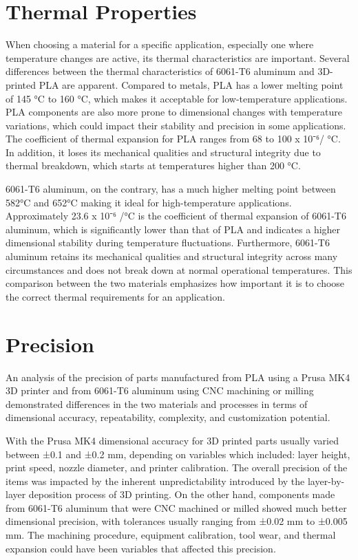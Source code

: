 \section{Thermal Properties}

    When choosing a material for a specific application, especially one where temperature changes are
    active, its thermal characteristics are important. Several differences between the thermal
    characteristics of 6061-T6 aluminum and 3D-printed PLA are apparent. Compared to metals, PLA has a
    lower melting point of 145 °C to 160 °C, which makes it acceptable for low-temperature applications. PLA
    components are also more prone to dimensional changes with temperature variations, which could
    impact their stability and precision in some applications. The coefficient of thermal expansion \cite{pla_spec_ultimaker} for PLA
    ranges from 68 to 100 x 10⁻⁶/ °C. In addition, it loses its mechanical qualities and structural integrity due
    to thermal breakdown, which starts at temperatures higher than 200 °C.

    6061-T6 aluminum, on the contrary, has a much higher melting point between 582°C and 652°C making it ideal for high-temperature applications. Approximately 23.6 x 10⁻⁶ /°C is the coefficient of
    thermal expansion of 6061-T6 aluminum, which is significantly lower than that of PLA and indicates a higher dimensional stability during temperature fluctuations. Furthermore, 6061-T6 aluminum retains its
    mechanical qualities and structural integrity across many circumstances and does not break down at
    normal operational temperatures. This comparison between the two materials emphasizes how important it is to choose the correct thermal requirements for an application. \cite{aluminum_spec}

\section{Precision}

    An analysis of the precision of parts manufactured from PLA using a Prusa MK4 3D printer and from
    6061-T6 aluminum using CNC machining or milling demonstrated differences in the two materials and
    processes in terms of dimensional accuracy, repeatability, complexity, and customization potential.

    With the Prusa MK4 dimensional accuracy for 3D printed parts usually varied between ±0.1 and ±0.2 mm,
    depending on variables which included: layer height, print speed, nozzle diameter, and printer calibration.
    The overall precision of the items was impacted by the inherent unpredictability introduced by the layer-by-layer deposition process of 3D printing. On the other hand, components made from 6061-T6 aluminum
    that were CNC machined or milled showed much better dimensional precision, with tolerances usually
    ranging from ±0.02 mm to ±0.005 mm. The machining procedure, equipment calibration, tool wear, and
    thermal expansion could have been variables that affected this precision.


